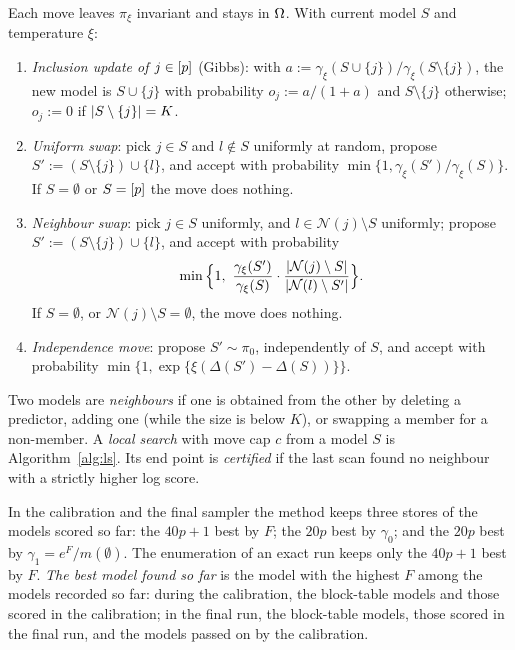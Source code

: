 \begin{definition}\label{def:moves}
Each move leaves $\pi_\xi$ invariant and stays in $\Omega$. With current model $S$ and temperature $\xi$:
\begin{enumerate}[label=(\roman*),leftmargin=2em,itemsep=1pt]
  \item \emph{Inclusion update of $j\in[p]$} (Gibbs): with $a:=\gamma_\xi(S\cup\{j\})/\gamma_\xi(S\setminus\{j\})$,
    the new model is $S\cup\{j\}$ with probability $o_j:=a/(1+a)$ and $S\setminus\{j\}$ otherwise; $o_j:=0$ if
    $\lvert S\setminus\{j\}\rvert=K$.
  \item \emph{Uniform swap}: pick $j\in S$ and $l\notin S$ uniformly at random, propose $S':=(S\setminus\{j\})\cup\{l\}$,
    and accept with probability $\min\{1,\gamma_\xi(S')/\gamma_\xi(S)\}$. If $S=\emptyset$ or $S=[p]$ the move does
    nothing.
  \item \emph{Neighbour swap}: pick $j\in S$ uniformly, and $l\in\mathcal N(j)\setminus S$ uniformly; propose
    $S':=(S\setminus\{j\})\cup\{l\}$, and accept with probability
    \[
      \min\Big\{1,\ \frac{\gamma_\xi(S')}{\gamma_\xi(S)}\cdot\frac{\abs{\mathcal N(j)\setminus S}}{\abs{\mathcal N(l)\setminus S'}}\Big\}.
    \]
    If $S=\emptyset$, or $\mathcal N(j)\setminus S=\emptyset$, the move does nothing.
  \item \emph{Independence move}: propose $S'\sim\pi_0$, independently of $S$, and accept with probability
    $\min\{1,\exp\{\xi(\Delta(S')-\Delta(S))\}\}$.
\end{enumerate}
\end{definition}

\begin{definition}\label{def:localsearch}
Two models are \emph{neighbours} if one is obtained from the other by deleting a predictor, adding one (while the size is
below $K$), or swapping a member for a non-member. A \emph{local search} with move cap $c$ from a model $S$ is
Algorithm~\ref{alg:ls}. Its end point is \emph{certified} if the last scan found no neighbour with a strictly higher log
score.
\end{definition}

\begin{definition}\label{def:stores}
In the calibration and the final sampler the method keeps three stores of the models scored so far: the $40p+1$ best by $F$;
the $20p$ best by $\gamma_0$; and the $20p$ best by $\gamma_1=e^{F}/m(\emptyset)$. The enumeration of an exact run keeps only the $40p+1$ best by $F$. \emph{The best model found so far} is the model with the
highest $F$ among the models recorded so far: during the calibration, the block-table models and those scored in the
calibration; in the final run, the block-table models, those scored in the final run, and the models passed on by the
calibration.
\end{definition}

